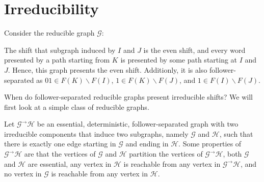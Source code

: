 \documentclass{article}
\newcommand{\Lc}{\mathcal{L}}  %
\newcommand{\Gc}{\mathcal{G}}  %
\newcommand{\Hc}{\mathcal{H}}  %
\newcommand{\GtH}{\Gc^\to\Hc}
\theoremstyle{definition}
\begin{document}

\section{Irreducibility}

\noindent Consider the reducible graph \(\Gc\):

\begin{figure}[h]
    \centering
\end{figure}

\noindent The shift that subgraph induced by \(I\) and \(J\) is the even shift, and every 
word presented by a path starting from \(K\) is presented by some path starting at 
\(I\) and \(J\). Hence, this graph presents the even shift. Additionly, it is 
also follower-separated as \(01 \in F(K)\backslash F(I)\), \(1 \in F(K)\backslash F(J)\),
and \(1 \in F(I) \backslash F(J)\). 

When do follower-separated reducible graphs present irreducible shifts? We will first look 
at a simple class of reducible graphs.

Let \(\GtH\) be an essential, deterministic, follower-separated graph with two irreducible components
that induce two subgraphs, namely \(\Gc\) and \(\Hc\), such that there is 
exactly one edge starting in \(\Gc\) and ending in \(\Hc\). 
Some properties of \(\GtH\) are that the vertices of \(\Gc\) and \(\Hc\)
partition the vertices of \(\GtH\), both \(\Gc\) and \(\Hc\) are essential,  
any vertex in \(\Hc\) is reachable from any vertex in \(\GtH\), and no vertex in \(\Gc\) 
is reachable from any vertex in \(\Hc\).
\end{document}
